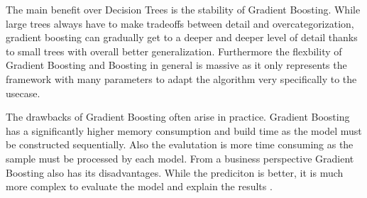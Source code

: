 The main benefit over Decision Trees is the stability of Gradient Boosting. While large trees always have to make tradeoffs 
between detail and overcategorization, gradient boosting can gradually get to a deeper and deeper level of detail thanks to 
small trees with overall better generalization. Furthermore the flexbility of Gradient Boosting and Boosting in general is massive 
as it only represents the framework with many parameters to adapt the algorithm very specifically to the usecase.  

The drawbacks of Gradient Boosting often arise in practice. Gradient Boosting has a significantly higher memory consumption and 
build time as the model must be constructed sequentially. Also the evalutation is more time consuming as the sample must be processed 
by each model. From a business perspective Gradient Boosting also has its disadvantages. While the prediciton is better, it is much 
more complex to evaluate the model and explain the results \cite[7.2]{Natekin2013}. 
